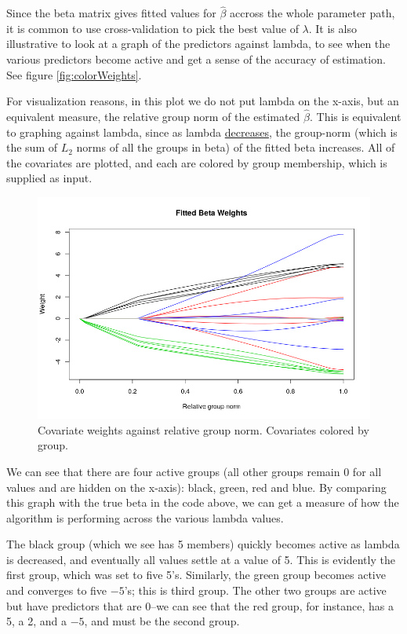\documentclass[12pt]{article}
\begin{document}
Since the beta matrix gives fitted values for $\hat{\beta}$ accross the whole parameter path, it is common to use cross-validation to pick the best value of $\lambda$. It is also illustrative to look at a graph of the predictors against lambda, to see when the various predictors become active and get a sense of the accuracy of estimation. See figure  \autoref{fig:colorWeights}.

For visualization reasons, in this plot we do not put lambda on the x-axis, but an equivalent measure, the relative group norm of the estimated $\hat{\beta}$. This is equivalent to graphing against lambda, since as lambda \underline{decreases}, the group-norm (which is the sum of $L_2$ norms of all the groups in beta) of the fitted beta increases. All of the covariates are plotted, and each are colored by group membership, which is supplied as input.


\begin{figure}[tb!]
\centering
\includegraphics[scale=0.5]{fitted_beta_weights.png}
\caption{Covariate weights against relative group norm. Covariates colored by group.}
\label{fig:colorWeights}
\end{figure}

We can see that there are four active groups (all other groups remain 0 for all values and are hidden on the x-axis): black, green, red and blue. By comparing this graph with the true beta in the code above, we can get a measure of how the algorithm is performing across the various lambda values.

The black group (which we see has 5 members) quickly becomes active as lambda is decreased, and eventually all values settle at a value of 5. This is evidently the first group, which was set to five 5's. Similarly, the green group becomes active and converges to five $-5$'s; this is third group. The other two groups are active but have predictors that are 0--we can see that the red group, for instance, has a 5, a 2, and a $-5$, and must be the second group.
\end{document}
